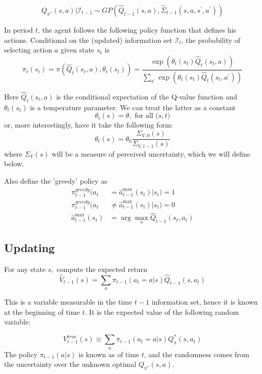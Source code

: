 \documentclass[12pt]{article}%
\begin{document}
\[
Q_{\pi^{*}}(s,a) | \mathcal{I}_{t-1} \sim GP( \widehat Q_{t-1}(s,a),
\widehat\Sigma_{t-1}( s,a,s^{\prime},a^{\prime}))
\]


In period $t$, the agent follows the following policy function that defines
his actions. Conditional on the (updated) information set $\mathcal{I}_{t}$,
the probability of selecting action $a$ given state $s_{t}$ is
\[
\pi_{t}(s_{t})=\pi(\widehat{Q}_{t}(s_{t},a),\theta_{t}(s_{t}))=\frac
{\exp(\theta_{t}(s_{t})\widehat{Q}_{t}(s_{t},a))}{\sum_{a^{\prime}}\exp
(\theta_{t}(s_{t})\widehat{Q}_{t}(s_{t},a^{\prime}))}%
\]


Here $\widehat{Q}_{t}(s_{t},a)$ is the conditional expectation of the Q-value
function and $\theta_{t}(s_{t})$ is a temperature parameter. We can treat the
latter as a constant%
\[
\theta_{t}(s)=\theta,\text{ for all (}s,t)
\]
or, more interestingly, have it take the following form:
\[
\theta_{t}(s)=\theta_{0}\frac{\Sigma_{V,0}(s)}{\Sigma_{V,t-1}(s)}%
\]
where $\Sigma_{V}(s)$ will be a measure of perceived uncertainty, which we
will define below.

Also define the 'greedy' policy as
\begin{align*}
\pi_{t-1}^{greedy}(a_{t}  &  =\widehat{a}_{t-1}^{\max}(s_{t})|s_{t})=1\\
\pi_{t-1}^{greedy}(a_{t}  &  \neq\widehat{a}_{t-1}^{\max}(s_{t})|s_{t})=0\\
\widehat{a}_{t-1}^{\max}(s_{t})  &  =\arg\max_{a}\widehat{Q}_{t-1}(s_{t}%
,a_{t})
\end{align*}


\subsection{Updating}

For any state $s,$ compute the expected return%
\[
\widehat{V}_{t-1}(s)=\sum_{a}\pi_{t-1}(a_{t}=a|s)\widehat{Q}_{t-1}(s,a_{t})
\]


This is a variable measurable in the time $t-1$ information set, hence it is
known at the beginning of time $t$. It is the expected value of the following
random variable:%

\[
V_{t-1}^{true}(s)\equiv\sum_{a}\pi_{t-1}(a_{t}=a|s)Q_{\pi}^{\ast}(s,a_{t})
\]
The policy $\pi_{t-1}(a|s)$ is known as of time $t$, and the randomness comes
from the uncertainty over the unknown optimal $Q_{\pi^{*}}(s,a).$
\end{document}
